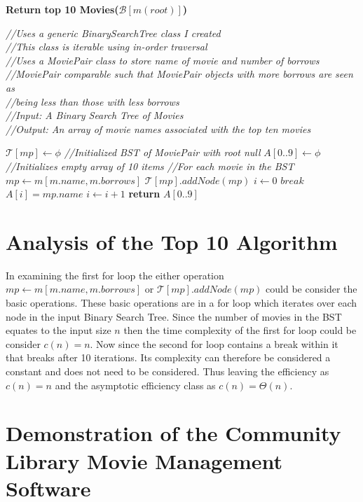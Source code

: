 \documentclass[a4paper,12pt]{article}
\begin{document}
\begin{algorithm}
\caption{\textbf{Return top 10 Movies($ \mathcal B[m(root)]$)}}
\emph{//Uses a generic BinarySearchTree class I created}\\
\emph{//This class is iterable using in-order traversal}\\
\emph{//Uses a MoviePair class to store name of movie and number of borrows}\\
\emph{//MoviePair comparable such that MoviePair objects with more borrows are seen as}\\
\emph{//being less than those with less borrows}\\
\emph{//Input: A Binary Search Tree of Movies}\\
\emph{//Output: An array of movie names associated with the top ten movies}
\begin{algorithmic}[1]
\State $\mathcal T[mp] \leftarrow \phi$ \emph{//Initialized BST of MoviePair with root null}
\State $A[0..9] \leftarrow \phi$ \emph{//Initializes empty array of 10 items}
 \emph{//For each movie in the BST}
	\State $mp \leftarrow m[m.name, m.borrows]$ 
	\State $ \mathcal T[mp].addNode(mp)$
\EndFor
\State $i \leftarrow 0$
		\State $break$
	\EndIf
	\State $A[i] = mp.name$
	\State $i \leftarrow i + 1$
\EndFor
\State \textbf{return} $A[0..9]$
\end{algorithmic}
\end{algorithm}
\section{Analysis of the Top 10 Algorithm}
In examining the first for loop the either operation $mp \leftarrow m[m.name, m.borrows]$ or $ \mathcal T[mp].addNode(mp)$ could be consider the basic operations. These basic operations are in a for loop which iterates over each node in the input Binary Search Tree. Since the number of movies in the BST equates to the input size $n$ then the time complexity of the first for loop could be consider $c(n) = n$. Now since the second for loop contains a break within it that breaks after 10 iterations. Its complexity can therefore be considered a constant and does not need to be considered. Thus leaving the efficiency as $c(n) = n$ and the asymptotic efficiency class as $c(n) = \Theta(n)$.

\newpage

\section{Demonstration of the Community Library Movie Management Software}
\end{document}
